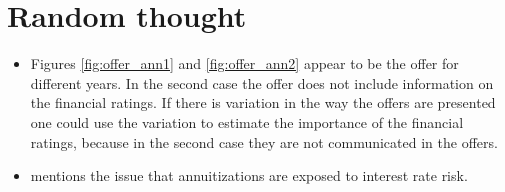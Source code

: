\documentclass[12pt]{article}
\theoremstyle{plain}
\theoremstyle{plain}
\begin{document}
\section{Random thought}
\begin{itemize}
    \item Figures \ref{fig:offer_ann1} and \ref{fig:offer_ann2} appear to be the offer for different years. In the second case the offer does not include information on the financial ratings. If there is variation in the way the offers are presented one could use the variation to estimate the importance of the financial ratings, because in the second case they are not communicated in the offers. 

    \item \textcite[p.16]{james_pensiones_2005} mentions the issue that annuitizations are exposed to interest rate risk. 
\end{itemize}


 


\newpage
\printbibliography

 
\end{document}
